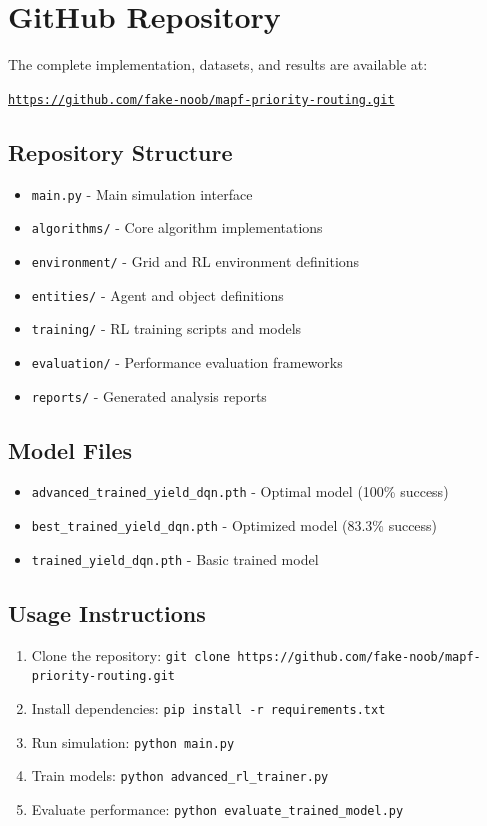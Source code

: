 \documentclass[12pt, a4paper]{report}
\newcommand{\githublink}[1]{\href{#1}{\texttt{#1}}}
\begin{document}
\appendix
\chapter{GitHub Repository}

The complete implementation, datasets, and results are available at:
\begin{center}
\Large\githublink{https://github.com/fake-noob/mapf-priority-routing.git}
\end{center}

\section{Repository Structure}
\begin{itemize}
    \item \texttt{main.py} - Main simulation interface
    \item \texttt{algorithms/} - Core algorithm implementations
    \item \texttt{environment/} - Grid and RL environment definitions
    \item \texttt{entities/} - Agent and object definitions
    \item \texttt{training/} - RL training scripts and models
    \item \texttt{evaluation/} - Performance evaluation frameworks
    \item \texttt{reports/} - Generated analysis reports
\end{itemize}

\section{Model Files}
\begin{itemize}
    \item \texttt{advanced\_trained\_yield\_dqn.pth} - Optimal model (100\% success)
    \item \texttt{best\_trained\_yield\_dqn.pth} - Optimized model (83.3\% success)
    \item \texttt{trained\_yield\_dqn.pth} - Basic trained model
\end{itemize}

\section{Usage Instructions}
\begin{enumerate}
    \item Clone the repository: \texttt{git clone https://github.com/fake-noob/mapf-priority-routing.git}
    \item Install dependencies: \texttt{pip install -r requirements.txt}
    \item Run simulation: \texttt{python main.py}
    \item Train models: \texttt{python advanced\_rl\_trainer.py}
    \item Evaluate performance: \texttt{python evaluate\_trained\_model.py}
\end{enumerate}
\end{document}
